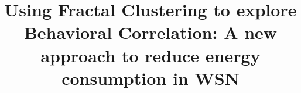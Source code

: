 \documentclass{acm_proc_article-sp}
\begin{document}
%

\title{Using Fractal Clustering to explore Behavioral Correlation: A new
approach to reduce energy consumption in WSN}



\maketitle
\end{document}
